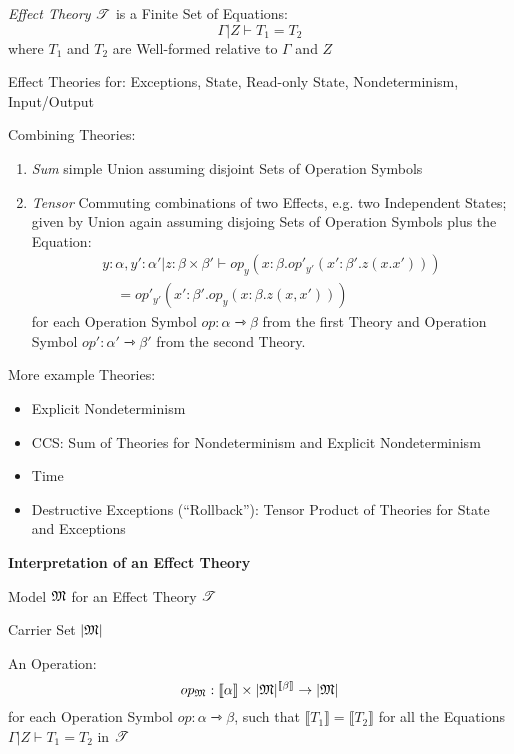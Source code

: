 \emph{Effect Theory} $\mathscr{T}$ is a Finite Set of Equations:
\[
  \Gamma | Z \vdash T_1 = T_2
\]
where $T_1$ and $T_2$ are Well-formed relative to $\Gamma$ and $Z$

Effect Theories for: Exceptions, State, Read-only State,
Nondeterminism, Input/Output %

Combining Theories:
\begin{enumerate}
  \item \emph{Sum} simple Union assuming disjoint Sets of Operation
    Symbols

  \item \emph{Tensor} Commuting combinations of two Effects, e.g. two
    Independent States; given by Union again assuming disjoing Sets of
    Operation Symbols plus the Equation:
    \[
    \begin{split}
      y:\alpha,y':\alpha' | z:\beta \times \beta' \vdash
        op_y(x:\beta.op'_{y'}(x':\beta'.z(x.x'))) \\
        \quad = op'_{y'}(x':\beta'.op_y(x:\beta.z(x,x')))
    \end{split}
    \]
    for each Operation Symbol $op : \alpha \rightarrowtriangle \beta$
    from the first Theory and Operation Symbol $op' : \alpha'
    \rightarrowtriangle \beta'$ from the second Theory.
\end{enumerate}

More example Theories:
\begin{itemize}
  \item Explicit Nondeterminism
  \item CCS: Sum of Theories for Nondeterminism and Explicit
    Nondeterminism
  \item Time
  \item Destructive Exceptions (``Rollback''): Tensor Product of
    Theories for State and Exceptions
\end{itemize}


\textbf{Interpretation of an Effect Theory}

Model $\mathfrak{M}$ for an Effect Theory $\mathscr{T}$

Carrier Set $|\mathfrak{M}|$

An Operation:
\[
  op_\mathfrak{M} : \llbracket \alpha \rrbracket \times
    |\mathfrak{M}|^{\llbracket \beta \rrbracket} \rightarrow |\mathfrak{M}|
\]
for each Operation Symbol $op:\alpha \rightarrowtriangle \beta$, such
that $\llbracket T_1 \rrbracket = \llbracket T_2 \rrbracket$ for all
the Equations $\Gamma | Z \vdash T_1 = T_2$ in $\mathscr{T}$

